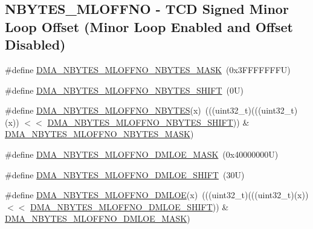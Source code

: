 \subsection*{N\+B\+Y\+T\+E\+S\+\_\+\+M\+L\+O\+F\+F\+NO -\/ T\+CD Signed Minor Loop Offset (Minor Loop Enabled and Offset Disabled)}
\begin{DoxyCompactItemize}
\item 
\#define \mbox{\hyperlink{group___d_m_a___register___masks_ga7c3faf561a42d91448404d94823535ff}{D\+M\+A\+\_\+\+N\+B\+Y\+T\+E\+S\+\_\+\+M\+L\+O\+F\+F\+N\+O\+\_\+\+N\+B\+Y\+T\+E\+S\+\_\+\+M\+A\+SK}}~(0x3\+F\+F\+F\+F\+F\+F\+F\+U)
\item 
\#define \mbox{\hyperlink{group___d_m_a___register___masks_ga0ce6afd8f00fcbe8d7dee4fcefa8ffdf}{D\+M\+A\+\_\+\+N\+B\+Y\+T\+E\+S\+\_\+\+M\+L\+O\+F\+F\+N\+O\+\_\+\+N\+B\+Y\+T\+E\+S\+\_\+\+S\+H\+I\+FT}}~(0\+U)
\item 
\#define \mbox{\hyperlink{group___d_m_a___register___masks_ga6ade3a2121a12d70dd34e978f92465e3}{D\+M\+A\+\_\+\+N\+B\+Y\+T\+E\+S\+\_\+\+M\+L\+O\+F\+F\+N\+O\+\_\+\+N\+B\+Y\+T\+ES}}(x)~(((uint32\+\_\+t)(((uint32\+\_\+t)(x)) $<$$<$ \mbox{\hyperlink{group___d_m_a___register___masks_ga0ce6afd8f00fcbe8d7dee4fcefa8ffdf}{D\+M\+A\+\_\+\+N\+B\+Y\+T\+E\+S\+\_\+\+M\+L\+O\+F\+F\+N\+O\+\_\+\+N\+B\+Y\+T\+E\+S\+\_\+\+S\+H\+I\+FT}})) \& \mbox{\hyperlink{group___d_m_a___register___masks_ga7c3faf561a42d91448404d94823535ff}{D\+M\+A\+\_\+\+N\+B\+Y\+T\+E\+S\+\_\+\+M\+L\+O\+F\+F\+N\+O\+\_\+\+N\+B\+Y\+T\+E\+S\+\_\+\+M\+A\+SK}})
\item 
\#define \mbox{\hyperlink{group___d_m_a___register___masks_ga3059dc9418c2806216aa96ef75adb3fe}{D\+M\+A\+\_\+\+N\+B\+Y\+T\+E\+S\+\_\+\+M\+L\+O\+F\+F\+N\+O\+\_\+\+D\+M\+L\+O\+E\+\_\+\+M\+A\+SK}}~(0x40000000\+U)
\item 
\#define \mbox{\hyperlink{group___d_m_a___register___masks_ga761f3f81137087b195be0750f33d7c5a}{D\+M\+A\+\_\+\+N\+B\+Y\+T\+E\+S\+\_\+\+M\+L\+O\+F\+F\+N\+O\+\_\+\+D\+M\+L\+O\+E\+\_\+\+S\+H\+I\+FT}}~(30\+U)
\item 
\#define \mbox{\hyperlink{group___d_m_a___register___masks_ga279995630f704fa55780fff62f590aaa}{D\+M\+A\+\_\+\+N\+B\+Y\+T\+E\+S\+\_\+\+M\+L\+O\+F\+F\+N\+O\+\_\+\+D\+M\+L\+OE}}(x)~(((uint32\+\_\+t)(((uint32\+\_\+t)(x)) $<$$<$ \mbox{\hyperlink{group___d_m_a___register___masks_ga761f3f81137087b195be0750f33d7c5a}{D\+M\+A\+\_\+\+N\+B\+Y\+T\+E\+S\+\_\+\+M\+L\+O\+F\+F\+N\+O\+\_\+\+D\+M\+L\+O\+E\+\_\+\+S\+H\+I\+FT}})) \& \mbox{\hyperlink{group___d_m_a___register___masks_ga3059dc9418c2806216aa96ef75adb3fe}{D\+M\+A\+\_\+\+N\+B\+Y\+T\+E\+S\+\_\+\+M\+L\+O\+F\+F\+N\+O\+\_\+\+D\+M\+L\+O\+E\+\_\+\+M\+A\+SK}})

\end{DoxyCompactItemize}
